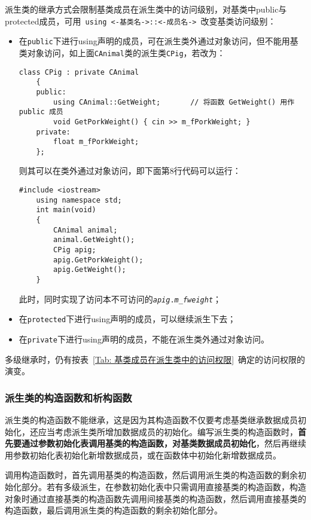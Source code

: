 \documentclass[10pt, a4paper, oneside, fontset=none]{ctexart}
\theoremstyle{plain}
\theoremstyle{definition}
\newcommand{\colors}[1]{\color{#1!75!black}}
\begin{document}
派生类的继承方式会限制基类成员在派生类中的访问级别，对基类中public与protected成员，可用~\lstinline[style=intro]|using <-基类名->::<-成员名->|~改变基类访问级别：
\begin{itemize}
	\item 在\texttt{public}下进行using声明的成员，可在派生类外通过对象访问，但不能用基类对象访问，如上面\texttt{CAnimal}类的派生类\texttt{CPig}，若改为：
\begin{lstlisting}[xleftmargin=1em, %
	moreemph={CAnimal, CPig}, emphstyle=\colors{qinglv}, %
	moreemph={[2]{animal, m_fweight, apig, m_fPorkWeight}}, emphstyle={[2]\it\ttfamily}, ]
	class CPig : private CAnimal
	{
	public:
		using CAnimal::GetWeight;		// 将函数 GetWeight() 用作 public 成员
		void GetPorkWeight() { cin >> m_fPorkWeight; }
	private:
		float m_fPorkWeight;
	};
\end{lstlisting}
	则其可以在类外通过对象访问，即下面第8行代码可以运行：
\begin{lstlisting}[xleftmargin=1em, %
	moreemph={CAnimal, CPig}, emphstyle=\colors{qinglv}, %
	moreemph={[2]{animal, m_fweight, apig, m_fPorkWeight}}, emphstyle={[2]\it\ttfamily}, ]
	#include <iostream>
	using namespace std;
	int main(void)
	{
		CAnimal animal;
		animal.GetWeight();
		CPig apig;
		apig.GetPorkWeight();
		apig.GetWeight();
	}
\end{lstlisting}
	此时，同时实现了访问本不可访问的\texttt{\textit{apig}.\textit{m\_fweight}}；

	\item 在\texttt{protected}下进行using声明的成员，可以继续派生下去；
	\item 在\texttt{private}下进行using声明的成员，不能在派生类外通过对象访问。
\end{itemize}

多级继承时，仍有按表~\ref{Tab: 基类成员在派生类中的访问权限}~确定的访问权限的演变。

\subsubsection{派生类的构造函数和析构函数}

派生类的构造函数不能继承，这是因为其构造函数不仅要考虑基类继承数据成员初始化，还应当考虑派生类所增加数据成员的初始化。编写派生类的构造函数时，\textbf{首先要通过参数初始化表调用基类的构造函数，对基类数据成员初始化}，然后再继续用参数初始化表初始化新增数据成员，或在函数体中初始化新增数据成员。

调用构造函数时，首先调用基类的构造函数，然后调用派生类的构造函数的剩余初始化部分。若有多级派生，在参数初始化表中只需调用直接基类的构造函数，构造对象时通过直接基类的构造函数先调用间接基类的构造函数，然后调用直接基类的构造函数，最后调用派生类的构造函数的剩余初始化部分。
\end{document}

